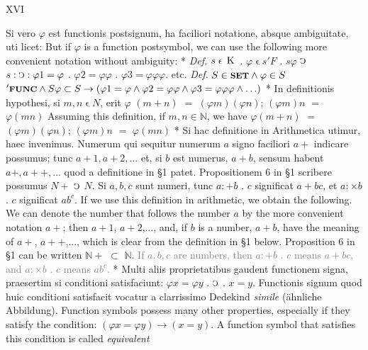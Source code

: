 \documentclass{book}
\newcommand{\s}{\switchcolumn} %
\newcommand{\C}{\mathop{\sbox0{$\displaystyle$$\reflectbox{C}$} %
\raisebox{-\height+\ht0-0.05cm}[\ht0][\dp0]{\scalebox{0.8}[0.8]{\copy0}}}\displaylimits} %
\newcommand{\smallIn}{\ensuremath{\mathrel{\epsilon}}}
\newcommand{\K}{\mathop{\thinspace \text{K} \thinspace}}
\newcommand{\setOfSets}{\mathord{\text{{\footnotesize \textbf{SET}}}}}
\newcommand{\func}{\mathord{\text{{\footnotesize \textbf{FUNC}}}}}
\newcommand\irrelavent[1]{\textcolor{gray}{#1}}
\newcommand{\peanoPage}[1]{\vspace{1ex}

  \columnratio{0.475, 0.05, 0.475} \begin{paracol}{3} \centering \hdashrule{\columnwidth}{0.1mm}{0.1mm 1mm} \s #1 \s \hdashrule{\columnwidth}{0.1mm}{0.1mm 1mm} \end{paracol}

\vspace{1ex}}
\newenvironment{translateTwoCol}
               { %
                 \columnratio{0.5, 0.5}
                 \begin{paracol}{2}
                 \newcommand{\LAT}{\switchcolumn[0]*}
                 \newcommand{\ENG}{\switchcolumn[1]}
               }
               { %
                 \let\ENG\undefined
                 \let\LAT\undefined
                 \end{paracol}
               }
\begin{document}
\peanoPage{XVI} %

\begin{translateTwoCol}
Si vero $\varphi$ est functionis postsignum, ha faciliori notatione, absque ambiguitate, uti licet:
\ENG
But if $\varphi$ is a function postsymbol, we can use the following more convenient notation without ambiguity:
\LAT
\emph{Def.} \hspace{0.25cm} $s \smallIn \K$ . $\varphi \smallIn s 'F$ . $s \varphi$ $\C$ $s : \C : \varphi 1 = \varphi$ . $\varphi 2 = \varphi \varphi$ . $\varphi 3 = \varphi \varphi \varphi$. etc.
\ENG
\emph{Def.} \hspace{0.25cm} $S \in \setOfSets \wedge \varphi \in S$ $'\func \wedge S \varphi \subset S \rightarrow ( \varphi 1 = \varphi \wedge \varphi 2 = \varphi \varphi \wedge \varphi 3 = \varphi \varphi \varphi \wedge \ldots)$
\LAT
In definitionis hypothesi, si $m, n \smallIn N$, erit $\varphi$ $(m+n)$ $=$ $(\varphi m)(\varphi n)$; $(\varphi m)n$ $=$ $\varphi (m n)$
\ENG
Assuming this definition, if $m, n \in \mathbb{N}$, we have $\varphi(m+n)$ $=$ $(\varphi m)(\varphi n)$; $(\varphi m)n$ $=$ $\varphi (m n)$
\LAT
Si hac definitione in Arithmetica utimur, haec invenimus. Numerum qui sequitur numerum $a$ signo faciliori $a +$ indicare possumus; tunc $a + 1, a+2,...$ et, si $b$ est numerus, $a + b$, sensum habent $a +, a + +,...$ quod a definitione in \S 1 patet. Propositionem 6 in \S 1 scribere possumus $N +$ $\C$ $N$. Si $a, b, c$ sunt numeri, tunc $a : + b$ . $c$ significat $a + b c$, et $a : \times b$ . $c$ significat $a b^c$.
\ENG
If we use this definition in arithmetic, we obtain the following. We can denote the number that follows the number $a$ by the more convenient notation $a+$; then $a + 1$, $a + 2$,..., and, if $b$ is a number, $a + b$, have the meaning of $a +$, $a ++$,..., which is clear from the definition in \S 1 below. Proposition 6 in \S 1 can be written $\mathbb{N} +$ $\subset$ $\mathbb{N}$. \irrelavent{If $a, b, c$ are numbers, then $a : + b$ . $c$ means $a + b c$, and $a : \times b$ . $c$ means $a b^c$.} %
\LAT
Multi aliis proprietatibus gaudent functionem signa, praesertim si conditioni satisfaciunt: $\varphi x = \varphi y$ . $\C$ . $x = y$. Functionis signum quod huic conditioni satisfacit vocatur a clarrissimo Dedekind \emph{simile} (\"ahnliche Abbildung).
\ENG
Function symbols possess many other properties, especially if they satisfy the condition: $(\varphi x = \varphi y) \rightarrow (x = y)$. A function symbol that satisfies this condition is called \emph{equivalent}
\end{translateTwoCol}
\end{document}
